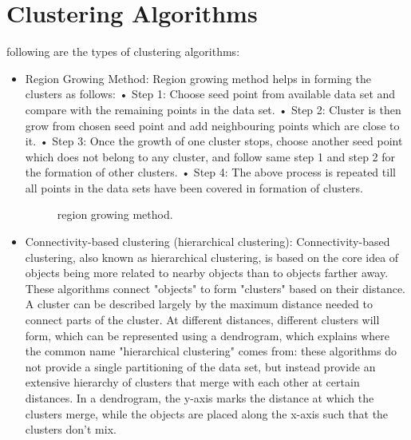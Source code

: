 \documentclass[12pt]{report}	%
\newcommand{\squeezeup}{\vspace{-0.6cm}}
\begin{document}
\section{Clustering Algorithms}
following are the types of clustering algorithms:
\begin{itemize}
    \item Region Growing Method:
    Region growing method helps in forming the clusters
    as follows:
        • Step 1: Choose seed point from available data
        set and compare with the remaining points in the
        data set.
        • Step 2: Cluster is then grow from chosen seed
        point and add neighbouring points which are close
        to it.
        • Step 3: Once the growth of one cluster stops,
        choose another seed point which does not belong
        to any cluster, and follow same step 1 and step 2
        for the formation of other clusters.
        • Step 4: The above process is repeated till all points
        in the data sets have been covered in formation of
        clusters.
        
        \begin{figure}[!h]
        	\captionsetup{font=scriptsize}
        	\begin{center}
        		\centerline{}
        		\caption{region growing method.}
        		\label{fig:1}
        	\end{center}
        	\squeezeup
        \end{figure}
    
	\item Connectivity-based clustering (hierarchical clustering):
	Connectivity-based clustering, also known as hierarchical clustering, is based on the core idea of objects being more related to nearby objects than to objects farther away. These algorithms connect "objects" to form "clusters" based on their distance. A cluster can be described largely by the maximum distance needed to connect parts of the cluster. At different distances, different clusters will form, which can be represented using a dendrogram, which explains where the common name "hierarchical clustering" comes from: these algorithms do not provide a single partitioning of the data set, but instead provide an extensive hierarchy of clusters that merge with each other at certain distances. In a dendrogram, the y-axis marks the distance at which the clusters merge, while the objects are placed along the x-axis such that the clusters don't mix.
	

\end{itemize}
\end{document}
